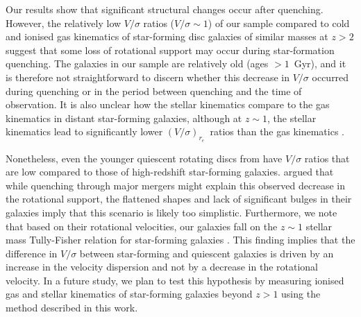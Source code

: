 \documentclass{aa}
\newcommand{\vsigma}{$(V/\sigma)_{r_e}$}
\begin{document}
Our results show that significant structural changes occur after quenching. However, the relatively low $V/\sigma$ ratios ($V/\sigma\sim1$) of our sample compared to cold and ionised gas kinematics of star-forming disc galaxies of similar masses at $z>2$ \citep[$V/\sigma\gtrsim3$; e.g.][]{NForsterSchreiber2009, BEpinat2009,EWisnioski2015,EWisnioski2019,MNeeleman2020,FRizzo2021,FFraternali2021,EParlanti2023,ADanhaive2025} suggest that some loss of rotational support may occur during star-formation quenching. The galaxies in our sample are relatively old (ages $>1$~Gyr), and it is therefore not straightforward to discern whether this decrease in $V/\sigma$ occurred during quenching or in the period between quenching and the time of observation. It is also unclear how the stellar kinematics compare to the gas kinematics in distant star-forming galaxies, although at $z\sim1$, the stellar kinematics lead to significantly lower \vsigma\ ratios than the gas kinematics \citep{HUebler2024}. 

Nonetheless, even the younger quiescent rotating discs from \citet{ANewman2018b} have $V/\sigma$ ratios that are low compared to those of high-redshift star-forming galaxies. \citet{ANewman2018b} argued that while quenching through major mergers might explain this observed decrease in the rotational support, the flattened shapes and lack of significant bulges in their galaxies imply that this scenario is likely too simplistic. Furthermore, we note that based on their rotational velocities, our galaxies fall on the $z\sim1$ stellar mass Tully-Fisher relation for star-forming galaxies \citep{CConselice2005}. This finding implies that the difference in $V/\sigma$ between star-forming and quiescent galaxies is driven by an increase in the velocity dispersion and not by a decrease in the rotational velocity.
In a future study, we plan to test this hypothesis by measuring ionised gas and stellar kinematics of star-forming galaxies beyond $z>1$ using the method described in this work.
\end{document}
